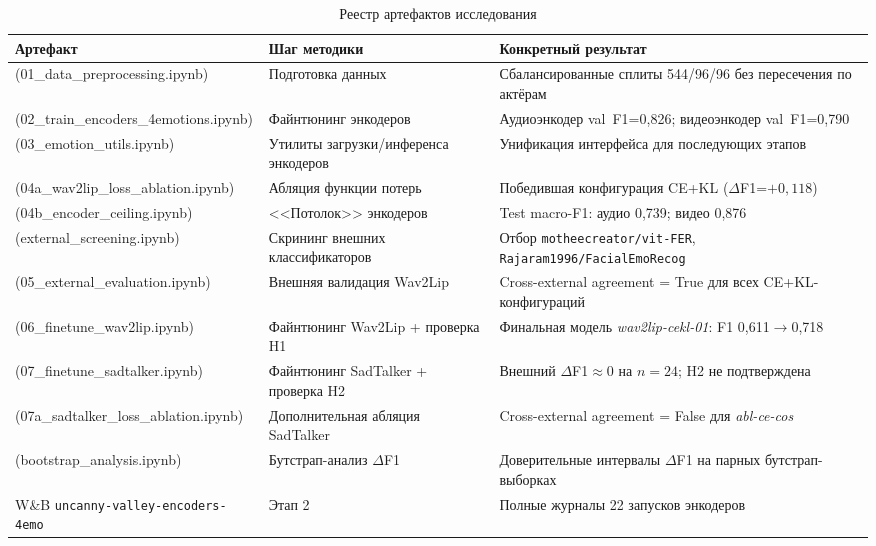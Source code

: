 \documentclass[a4paper, 12pt, oneside, openany]{article}
\begin{document}
\begin{table}[H]
\caption{Реестр артефактов исследования}
\label{tab:artifacts}
\centering
\small
\begin{tabular}{|p{4.7cm}|p{3.5cm}|p{6.5cm}|}
\hline
\textbf{Артефакт} & \textbf{Шаг методики} & \textbf{Конкретный результат} \\
\hline
[01\_data\_preprocessing.ipynb](01\_data\_preprocessing.ipynb) & Подготовка данных & Сбалансированные сплиты 544/96/96 без пересечения по актёрам \\
\hline
[02\_train\_encoders\_4emotions.ipynb](02\_train\_encoders\_4emotions.ipynb) & Файнтюнинг энкодеров & Аудиоэнкодер val~F1=0,826; видеоэнкодер val~F1=0,790 \\
\hline
[03\_emotion\_utils.ipynb](03\_emotion\_utils.ipynb) & Утилиты загрузки/инференса энкодеров & Унификация интерфейса для последующих этапов \\
\hline
[04a\_wav2lip\_loss\_ablation.ipynb](04a\_wav2lip\_loss\_ablation.ipynb) & Абляция функции потерь & Победившая конфигурация CE+KL ($\Delta$F1=$+0{,}118$) \\
\hline
[04b\_encoder\_ceiling.ipynb](04b\_encoder\_ceiling.ipynb) & <<Потолок>> энкодеров & Test macro-F1: аудио 0,739; видео 0,876 \\
\hline
[external\_screening.ipynb](external\_screening.ipynb) & Скрининг внешних классификаторов & Отбор \texttt{motheecreator/vit-FER}, \texttt{Rajaram1996/FacialEmoRecog} \\
\hline
[05\_external\_evaluation.ipynb](05\_external\_evaluation.ipynb) & Внешняя валидация Wav2Lip & Cross-external agreement = True для всех CE+KL-конфигураций \\
\hline
[06\_finetune\_wav2lip.ipynb](06\_finetune\_wav2lip.ipynb) & Файнтюнинг Wav2Lip + проверка H1 & Финальная модель \textit{wav2lip-cekl-01}: F1 0,611$\to$0,718 \\
\hline
[07\_finetune\_sadtalker.ipynb](07\_finetune\_sadtalker.ipynb) & Файнтюнинг SadTalker + проверка H2 & Внешний $\Delta$F1$\approx 0$ на $n=24$; H2 не подтверждена \\
\hline
[07a\_sadtalker\_loss\_ablation.ipynb](07a\_sadtalker\_loss\_ablation.ipynb) & Дополнительная абляция SadTalker & Cross-external agreement = False для \textit{abl-ce-cos} \\
\hline
[bootstrap\_analysis.ipynb](bootstrap\_analysis.ipynb) & Бутстрап-анализ $\Delta$F1 & Доверительные интервалы $\Delta$F1 на парных бутстрап-выборках \\
\hline
W\&B \texttt{uncanny-valley-encoders-4emo} & Этап 2 & Полные журналы 22 запусков энкодеров \\

\end{tabular}
\end{table}
\end{document}
